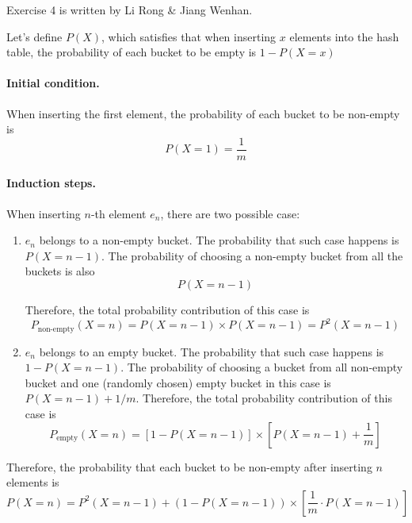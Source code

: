 


\def\HWTITLE{Homework 6}
\def\COURSECODE{CS 225: Data Structures}
\def\AUTHOR{Group D1}



\makeMyTitle

Exercise 4 is written by Li Rong \& Jiang Wenhan.

\thispagestyle{firstPage}

\begin{questions}



    Let's define $P(X)$, which satisfies that when inserting $x$ elements into the hash table, the probability of each bucket to be empty is $1-P(X=x)$

    \paragraph{Initial condition.} When inserting the first element, the probability of each bucket to be non-empty is
    \[P(X=1)=\frac{1}{m}\]

    \paragraph{Induction steps.} When inserting $n$-th element $e_n$, there are two possible case:

    \begin{enumerate}
        \item $e_n$ belongs to a non-empty bucket. The probability that such case happens is $P(X=n-1)$. The probability of choosing a non-empty bucket from all the buckets is also \[P(X=n-1)\]
        
        Therefore, the total probability contribution of this case is \[P_\text{non-empty}(X=n)=P(X=n-1)\times P(X=n-1) = P^2(X=n-1)\]
        
        \item $e_n$ belongs to an empty bucket. The probability that such case happens is $1-P(X=n-1)$. The probability of choosing a bucket from all non-empty bucket and one (randomly chosen) empty bucket in this case is $P(X=n-1) + 1/m$. Therefore, the total probability contribution of this case is \[P_\text{empty}(X=n)=\left[ 1-P(X=n-1) \right]\times \left[P(X=n-1) + \frac{1}{m}\right]\]
    \end{enumerate}

    Therefore, the probability that each bucket to be non-empty after inserting $n$ elements is \[ P(X=n) = P^2(X=n-1) + (1-P(X=n-1))\times \left[ \frac{1}{m}\cdot P(X=n-1)\right]\]


\end{questions}
